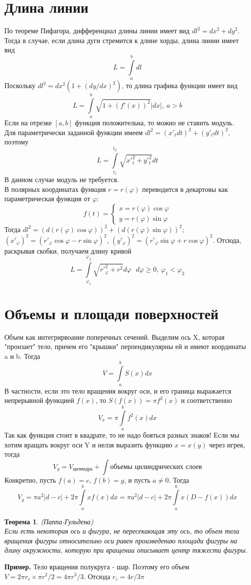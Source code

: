 \documentclass[a4paper]{article}
\newtheorem{theor}{Теорема}
\begin{document}
\section{Длина линии}
По теореме Пифагора, дифференциал длины линии имеет вид
$dl^2=dx^2+dy^2$. Тогда в случае, если длина дуги стремится к длине хорды, 
длина линии имеет вид
$$L=\int\limits^b_adl$$
Поскольку $dl^2=dx^2(1+(dy/dx)^2)$, то длина графика функции имеет вид
$$L=\int\limits^b_a\sqrt{1+(f'(x))^2}|dx|,~a>b$$
Если на отрезке $[a,b]$ функция положительна, то можно не ставить модуль.\\
Для параметрически заданной функции имеем $dl^2=(x'_tdt)^2+(y'_tdt)^2$, 
поэтому
$$L=\int\limits^{t_2}_{t_1}\sqrt{x'^2_t+y'^2_t}dt$$
В данном случае модуль не требуется.\\
В полярных координатах функция $r=r(\varphi)$ переводится в декартовы как
параметрическая функция от $\varphi$: 
$$f(t)=\begin{cases}x=r(\varphi)\cos\varphi\\y=r(\varphi)\sin\varphi
\end{cases}$$
Тогда $dl^2=(d(r(\varphi)\cos\varphi))^2+(d(r(\varphi)\sin\varphi))^2$;
$(x'_\varphi)^2=(r'_\varphi\cos\varphi-r\sin\varphi)^2$, $(y'_\varphi)^2=
(r'_\varphi\sin\varphi+r\cos\varphi)^2$. Отсюда, раскрывая скобки, получаем 
длину кривой  
$$L=\int\limits_{\varphi_1}^{\varphi_2}\sqrt{r'^2_\varphi+r^2}d\varphi~~~
d\varphi\geqslant0,~\varphi_1<\varphi_2$$
\section{Объемы и площади поверхностей}
Объем как интегрирвоание поперечных сечений. Выделим ось X, которая "пронзает"
тело, причем его "крышки" перпендикулярны ей и имеют координаты a и b. Тогда
$$V=\int\limits^b_aS(x)dx$$
В частности, если это тело вращения вокруг оси, и его граница выражается 
непрерывной функцией $f(x)$, то $S(f(x))=\pi f^2(x)$ и соответственно 
$$V_x=\pi\int\limits^b_af^2(x)dx$$
Так как функция стоит в квадрате, то не надо бояться разных знаков!
Если мы хотим вращать вокруг оси Y и нелзя выразить функцию $x=x(y)$ через
игрек, тогда
$$V_y=V_\text{цилиндра}+\int\text{объемы цилиндрических слоев}$$
Конкретно, пусть $f(a)=c$, $f(b)=g$, и пусть $a\ne0$. Тогда
$$V_y=\pi a^2|d-c|+2\pi\int\limits^b_axf(x)dx=\pi a^2|d-c|+2\pi\int\limits^
b_ax(D-f(x))dx$$
\begin{theor}
(Паппа-Гульдена)\\
Если есть некоторая ось и фигура, не пересекающая эту ось, то объем тела
вращения фигуры относительно оси равен произведению площади фигуры на длину
окружности, которую при вращении описывает центр тяжести фигуры.
\end{theor}
\textbf{Пример.} Тело вращения полукруга - шар. Поэтому его объем $V=2\pi 
r_c\times \pi r^2/2=4\pi r^3/3$. Отсюда $r_c=4r/3\pi$
\end{document}
